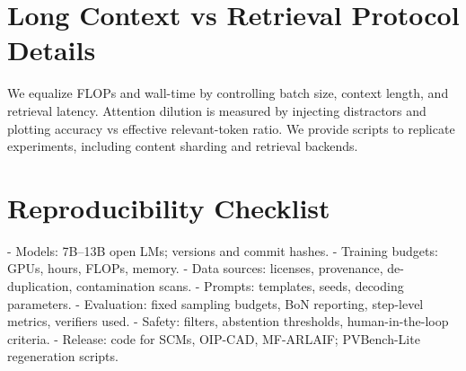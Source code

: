 \documentclass{article}
\begin{document}
\section{Long Context vs Retrieval Protocol Details}
We equalize FLOPs and wall-time by controlling batch size, context length, and retrieval latency. Attention dilution is measured by injecting distractors and plotting accuracy vs effective relevant-token ratio. We provide scripts to replicate experiments, including content sharding and retrieval backends.

\section{Reproducibility Checklist}
\label{app:repro}
- Models: 7B–13B open LMs; versions and commit hashes.
- Training budgets: GPUs, hours, FLOPs, memory.
- Data sources: licenses, provenance, de-duplication, contamination scans.
- Prompts: templates, seeds, decoding parameters.
- Evaluation: fixed sampling budgets, BoN reporting, step-level metrics, verifiers used.
- Safety: filters, abstention thresholds, human-in-the-loop criteria.
- Release: code for SCMs, OIP-CAD, MF-ARLAIF; PVBench-Lite regeneration scripts.
\end{document}
